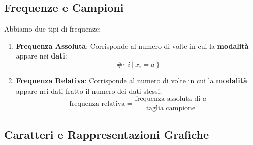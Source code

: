 \documentclass{article}
\begin{document}
\subsection{Frequenze e Campioni}

Abbiamo due tipi di frequenze:

\begin{enumerate}
    \item \textbf{Frequenza Assoluta}: Corrisponde al numero di volte in cui la \textbf{modalità} appare nei \textbf{dati}:
    \[ \#\{\: i \: |\:x_{i} = a \:\} \]
    \item \textbf{Frequenza Relativa}: Corrisponde al numero di volte in cui la \textbf{modalità} appare nei dati fratto il numero dei dati stessi:
    \[ \text{frequenza relativa} = \frac{\text{frequenza assoluta di }a}{\text{taglia campione}} \]
\end{enumerate}

\subsection{Caratteri e Rappresentazioni Grafiche}
\end{document}
